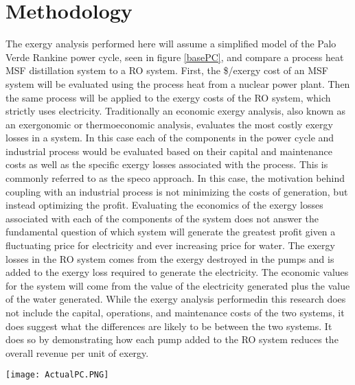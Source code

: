 \section{Methodology}
 The exergy analysis performed here will assume a simplified model of the Palo Verde Rankine power cycle, seen in figure \ref{basePC}, and compare a process heat MSF distillation system to a RO system.  First, the  \$/exergy cost of an MSF system will be evaluated using the process heat from a nuclear power plant. Then the same process will be applied to the exergy costs of the RO system, which strictly uses electricity. Traditionally an economic exergy analysis, also known as an exergonomic or thermoeconomic analysis, evaluates the most costly exergy losses in a system. In this case each of the components in the power cycle and industrial process would be evaluated based on their capital and maintenance costs as well as the specific exergy losses associated with the process.  This is commonly referred to as the \ac{speco} approach.  In this case, the motivation behind coupling with an industrial process is not minimizing the costs of generation, but instead optimizing the profit.  Evaluating the economics of the exergy losses associated with each of the components of the system does not answer the fundamental question of which system will generate the greatest profit given a fluctuating price for electricity and ever increasing price for water. The exergy losses in the RO system comes from the exergy destroyed in the pumps and is added to the exergy loss required to generate the electricity. The economic values for the system will come from the value of the electricity generated plus the value of the water generated. While the exergy analysis performedin this research does not include the capital, operations, and maintenance costs of the two systems, it does suggest what the differences are likely to be between the two systems.  It does so by demonstrating how each pump added to the RO system reduces the overall revenue per unit of exergy.

 \begin{figure*}[h!]
\centering
\texttt{[image: ActualPC.PNG]}
\caption{\small \sl Palo Verde's simplified Rankine cycle used for this research. The overall efficiency of the system is about 32\%, which is a reasonable approximation of the Palo Verde Power cycle.  The turbines are yellow, meaning warning, because of the liquid entering the turbines.  In reality, the turbines can still function with some liquid}
 \label{basePC}
\centering
\end{figure*}

